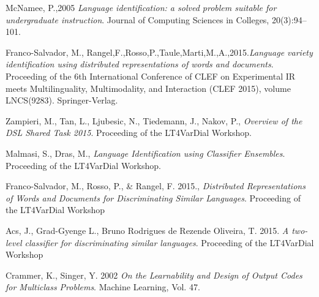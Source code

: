 \documentclass{article}
\begin{document}

\begin{thebibliography}{10}

 McNamee, P.,2005
\textit{Language identification: a solved problem suitable for undergraduate instruction}. Journal of Computing Sciences in Colleges, 20(3):94–101.

 Franco-Salvador, M., Rangel,F.,Rosso,P.,Taule,Marti,M.,A.,2015.\textit{Language variety identification using distributed representations of words and documents}. Proceeding of the 6th International Conference of CLEF on Experimental IR meets Multilinguality, Multimodality, and Interaction (CLEF 2015), volume LNCS(9283). Springer-Verlag.

 Zampieri, M., Tan, L., Ljubesic, N., Tiedemann, J., Nakov, P., \textit{Overview of the DSL Shared Task 2015}. Proceeding of the LT4VarDial Workshop.

 Malmasi, S., Dras, M., \textit{Language Identification using Classifier Ensembles}. Proceeding of the LT4VarDial Workshop.

 Franco-Salvador, M., Rosso, P., \& Rangel, F. 2015., \textit{Distributed Representations of Words and Documents for Discriminating Similar Languages}. Proceeding of the LT4VarDial Workshop

 Acs, J., Grad-Gyenge L., Bruno Rodrigues de Rezende Oliveira, T. 2015. \textit{A two-level classifier for discriminating similar languages}. Proceeding of the LT4VarDial Workshop

 Crammer, K., Singer, Y. 2002 \textit{On the Learnability and Design of Output Codes for Multiclass Problems}. Machine Learning, Vol. 47.

\end{thebibliography}
\end{document}

